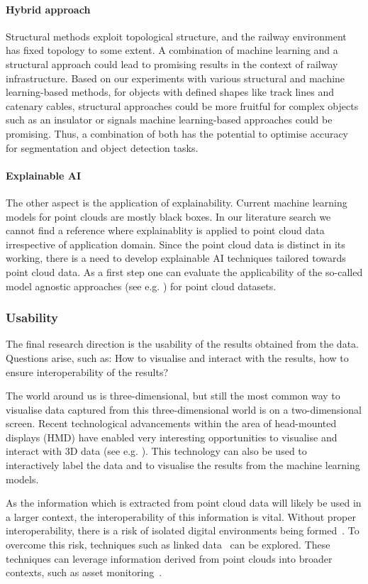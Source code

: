 \paragraph{Hybrid approach}
Structural methods exploit topological structure, and the railway environment has fixed topology to some extent. A combination of machine learning and a structural approach could lead to promising results in the context of railway infrastructure. Based on our experiments with various structural and machine learning-based methods, for objects with defined shapes like track lines and catenary cables, structural approaches could be more fruitful for complex objects such as an insulator or signals machine learning-based approaches could be promising. Thus, a combination of both has the potential to optimise accuracy for segmentation and object detection tasks.

\paragraph{Explainable AI}
The other aspect is the application of explainability. Current machine learning models for point clouds are mostly black boxes. In our literature search we cannot find a reference where explainablity is applied to point cloud data irrespective of application domain. Since the point cloud data is distinct in its working, there is a need to develop explainable AI techniques tailored towards point cloud data. As a first step one can evaluate the applicability of the so-called model agnostic approaches (see e.g. \cite{samek2023xai}) for point cloud datasets.

\subsubsection{Usability}
The final research direction is the usability of the results obtained from the data. Questions arise, such as: How to visualise and interact with the results, how to ensure interoperability of the results?

The world around us is three-dimensional, but still the most common way to visualise data captured from this three-dimensional world is on a two-dimensional screen. Recent technological advancements within the area of head-mounted displays (HMD) have enabled very interesting opportunities to visualise and interact with 3D data (see e.g. \cite{garrido2021point}). This technology can also be used to interactively label the data and to visualise the results from the machine learning models.

As the information which is extracted from point cloud data will likely be used in a larger context, the interoperability of this information is vital. Without proper interoperability, there is a risk of isolated digital environments being formed~\cite{rojas21}. To overcome this risk, techniques such as linked data~\cite{bizer2009linked} can be explored. These techniques can leverage information derived from point clouds into broader contexts, such as asset monitoring~\cite{tutcher14}.